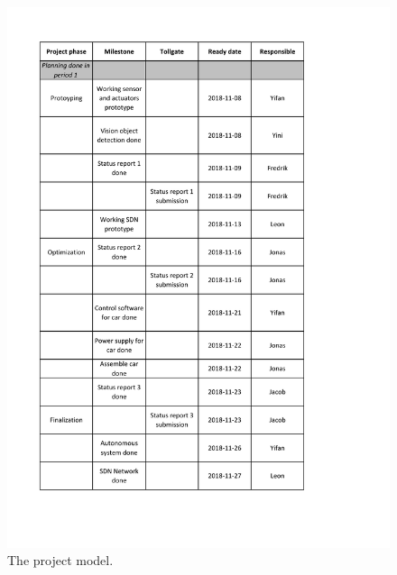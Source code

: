 \documentclass[11pt, titlepage]{article} %
\begin{document}
\begin{figure}
    \centering
    \includegraphics[scale=0.7]{project_model.pdf}
    \caption{The project model.}
    \label{fig:project_model}
\end{figure}
\end{document}
